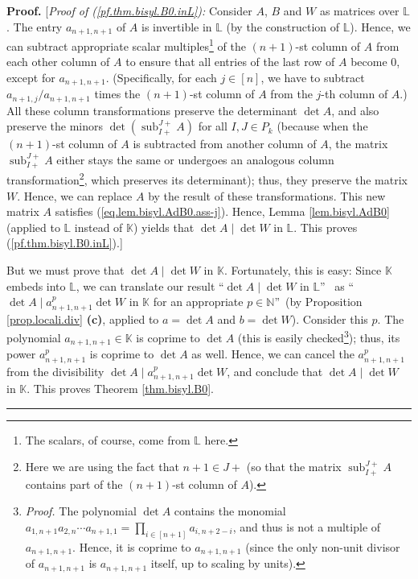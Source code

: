 \documentclass[numbers=enddot,12pt,final,onecolumn,notitlepage]{scrartcl}%
\theoremstyle{definition}
\newenvironment{proof}[1][Proof]{\noindent\textbf{#1.} }{\ \rule{0.5em}{0.5em}}
\let\prodnonlimits\prod
\renewcommand{\prod}{\prodnonlimits\limits}
\begin{document}
\begin{proof}
[\textit{Proof of (\ref{pf.thm.bisyl.B0.inL}):} Consider $A$, $B$ and $W$ as
matrices over $\mathbb{L}$. The entry $a_{n+1,n+1}$ of $A$ is invertible in
$\mathbb{L}$ (by the construction of $\mathbb{L}$). Hence, we can subtract
appropriate scalar multiples\footnote{The scalars, of course, come from
$\mathbb{L}$ here.} of the $\left(  n+1\right)  $-st column of $A$ from each
other column of $A$ to ensure that all entries of the last row of $A$ become
$0$, except for $a_{n+1,n+1}$. (Specifically, for each $j\in\left[  n\right]
$, we have to subtract $a_{n+1,j}/a_{n+1,n+1}$ times the $\left(  n+1\right)
$-st column of $A$ from the $j$-th column of $A$.) All these column
transformations preserve the determinant $\det A$, and also preserve the
minors $\det\left(  \operatorname*{sub}\nolimits_{I+}^{J+}A\right)  $ for all
$I,J\in P_{k}$ (because when the $\left(  n+1\right)  $-st column of $A$ is
subtracted from another column of $A$, the matrix $\operatorname*{sub}%
\nolimits_{I+}^{J+}A$ either stays the same or undergoes an analogous column
transformation\footnote{Here we are using the fact that $n+1\in J+$ (so that
the matrix $\operatorname*{sub}\nolimits_{I+}^{J+}A$ contains part of the
$\left(  n+1\right)  $-st column of $A$).}, which preserves its determinant);
thus, they preserve the matrix $W$. Hence, we can replace $A$ by the result of
these transformations. This new matrix $A$ satisfies
(\ref{eq.lem.bisyl.AdB0.ass-j}). Hence, Lemma \ref{lem.bisyl.AdB0} (applied to
$\mathbb{L}$ instead of $\mathbb{K}$) yields that $\det A\mid\det W$ in
$\mathbb{L}$. This proves (\ref{pf.thm.bisyl.B0.inL}).]

But we must prove that $\det A\mid\det W$ in $\mathbb{K}$. Fortunately, this
is easy: Since $\mathbb{K}$ embeds into $\mathbb{L}$, we can translate our
result \textquotedblleft$\det A\mid\det W$ in $\mathbb{L}$\textquotedblright%
\ as \textquotedblleft$\det A\mid a_{n+1,n+1}^{p}\det W$ in $\mathbb{K}$ for
an appropriate $p\in\mathbb{N}$\textquotedblright\ (by Proposition
\ref{prop.locali.div} \textbf{(c)}, applied to $a=\det A$ and $b=\det W$).
Consider this $p$. The polynomial $a_{n+1,n+1}\in\mathbb{K}$ is coprime to
$\det A$ (this is easily checked\footnote{\textit{Proof.} The polynomial $\det
A$ contains the monomial $a_{1,n+1}a_{2,n}\cdots a_{n+1,1}=\prod_{i\in\left[
n+1\right]  }a_{i,n+2-i}$, and thus is not a multiple of $a_{n+1,n+1}$. Hence,
it is coprime to $a_{n+1,n+1}$ (since the only non-unit divisor of
$a_{n+1,n+1}$ is $a_{n+1,n+1}$ itself, up to scaling by units).}); thus, its
power $a_{n+1,n+1}^{p}$ is coprime to $\det A$ as well. Hence, we can cancel
the $a_{n+1,n+1}^{p}$ from the divisibility $\det A\mid a_{n+1,n+1}^{p}\det
W$, and conclude that $\det A\mid\det W$ in $\mathbb{K}$. This proves Theorem
\ref{thm.bisyl.B0}.
\end{proof}
\end{document}
